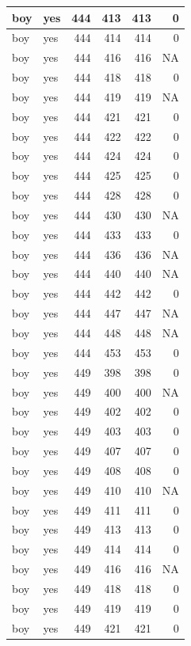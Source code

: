 \documentclass[man]{apa6}
\begin{document}
\begin{tabular}{l|l|r|r|r|r}
\hline
boy & yes & 444 & 413 & 413 & 0\\
\hline
boy & yes & 444 & 414 & 414 & 0\\
\hline
boy & yes & 444 & 416 & 416 & NA\\
\hline
boy & yes & 444 & 418 & 418 & 0\\
\hline
boy & yes & 444 & 419 & 419 & NA\\
\hline
boy & yes & 444 & 421 & 421 & 0\\
\hline
boy & yes & 444 & 422 & 422 & 0\\
\hline
boy & yes & 444 & 424 & 424 & 0\\
\hline
boy & yes & 444 & 425 & 425 & 0\\
\hline
boy & yes & 444 & 428 & 428 & 0\\
\hline
boy & yes & 444 & 430 & 430 & NA\\
\hline
boy & yes & 444 & 433 & 433 & 0\\
\hline
boy & yes & 444 & 436 & 436 & NA\\
\hline
boy & yes & 444 & 440 & 440 & NA\\
\hline
boy & yes & 444 & 442 & 442 & 0\\
\hline
boy & yes & 444 & 447 & 447 & NA\\
\hline
boy & yes & 444 & 448 & 448 & NA\\
\hline
boy & yes & 444 & 453 & 453 & 0\\
\hline
boy & yes & 449 & 398 & 398 & 0\\
\hline
boy & yes & 449 & 400 & 400 & NA\\
\hline
boy & yes & 449 & 402 & 402 & 0\\
\hline
boy & yes & 449 & 403 & 403 & 0\\
\hline
boy & yes & 449 & 407 & 407 & 0\\
\hline
boy & yes & 449 & 408 & 408 & 0\\
\hline
boy & yes & 449 & 410 & 410 & NA\\
\hline
boy & yes & 449 & 411 & 411 & 0\\
\hline
boy & yes & 449 & 413 & 413 & 0\\
\hline
boy & yes & 449 & 414 & 414 & 0\\
\hline
boy & yes & 449 & 416 & 416 & NA\\
\hline
boy & yes & 449 & 418 & 418 & 0\\
\hline
boy & yes & 449 & 419 & 419 & 0\\
\hline
boy & yes & 449 & 421 & 421 & 0\\

\end{tabular}
\end{document}
